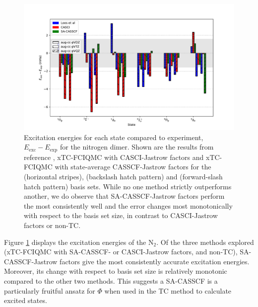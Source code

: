 \begin{figure}[!h]
    \centering
    \includegraphics[width=\textwidth]{figures/binding/n2_exc}
    \caption{Excitation energies for each state compared to experiment,\supercite{oddershedeComparison1985,huberConstants1979} $E_\mathrm{exc}-E_\mathrm{exp}$ for the nitrogen dimer. Shown are the results from reference  , xTC-FCIQMC with CASCI-Jastrow factors and xTC-FCIQMC with state-average CASSCF-Jastrow factors for the \avdz (horizontal stripes), \avtz (backslash hatch pattern) and \avqz (forward-slash hatch pattern) basis sets. While no one method strictly outperforms another, we do observe that SA-CASSCF-Jastrow factors perform the most consistently well and the error changes most monotonically with respect to the basis set size, in contrast to CASCI-Jastrow factors or non-TC.
        }
    \label{fig:n2-excite-relative}
\end{figure}

Figure \ref{fig:n2-excite-relative} displays the excitation energies of the N$_2$. Of the three methods explored (xTC-FCIQMC with SA-CASSCF- or CASCI-Jastrow factors, and non-TC), SA-CASSCF-Jastrow factors give the most consistently accurate excitation energies. Moreover, its change with respect to basis set size is relatively monotonic compared to the other two methods. This suggests a SA-CASSCF is a particularly fruitful ansatz for $\Phi$ when used in the TC method to calculate excited states.

